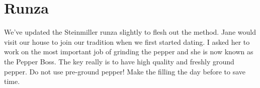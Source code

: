 \section[Runza]{Runza}

\begin{recipestats}[
        servings=16,
        preptime=4~\hour,
        bakingtime=30~\minute,
        inactivetime=overnight,
        source=Teresi Family,
        original=Mrs. Steinmiller,
    ]
\end{recipestats}

\begin{recipeabstract}
    We've updated the Steinmiller runza slightly to flesh out the method.
    Jane would visit our house to join our tradition when we first started dating.
    I asked her to work on the most important job of grinding the pepper and she is now known as the Pepper Boss.
    The key really is to have high quality and freshly ground pepper.
    Do not use pre-ground pepper!
    Make the filling the day before to save time.
\end{recipeabstract}

\bigskip
\bigskip

\begin{ingredientcolumns}
    \begin{ingredientblock}[filling]
        \\
        \\
        \\
        \\
        \\
    \end{ingredientblock}

    \bigskip
    \begin{ingredientblock}[dough]
        \\
        \\
        \\
        \\
        \\
        \\

    \end{ingredientblock}
\end{ingredientcolumns}

